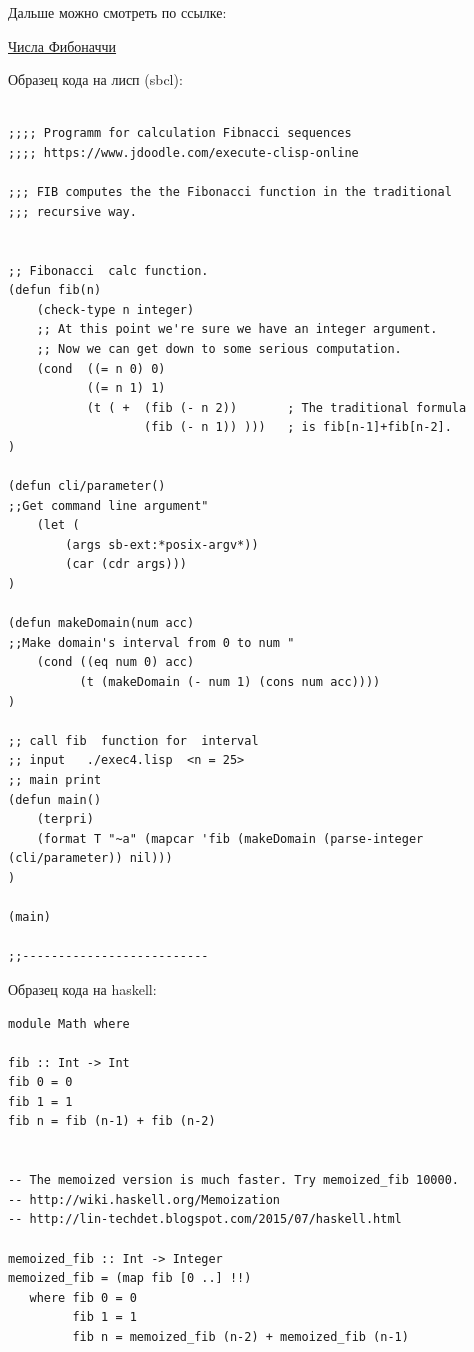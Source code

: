 \documentclass[12pt, leqno]{article}
\begin{document}
 

\clearpage 
 
Дальше можно смотреть по ссылке:

\href{https://ru.wikipedia.org/wiki/Числа_Фибоначчи}{Числа Фибоначчи}


\clearpage 

\noindent Образец кода на лисп (sbcl):  
\begin{verbatim}

;;;; Programm for calculation Fibnacci sequences
;;;; https://www.jdoodle.com/execute-clisp-online

;;; FIB computes the the Fibonacci function in the traditional
;;; recursive way.


;; Fibonacci  calc function. 
(defun fib(n)
    (check-type n integer)
    ;; At this point we're sure we have an integer argument.
    ;; Now we can get down to some serious computation.
    (cond  ((= n 0) 0)
           ((= n 1) 1)
           (t ( +  (fib (- n 2))       ; The traditional formula
                   (fib (- n 1)) )))   ; is fib[n-1]+fib[n-2].
)

(defun cli/parameter()
;;Get command line argument" 
    (let (
        (args sb-ext:*posix-argv*))
        (car (cdr args)))
)

(defun makeDomain(num acc)
;;Make domain's interval from 0 to num " 
    (cond ((eq num 0) acc)
          (t (makeDomain (- num 1) (cons num acc))))
)

;; call fib  function for  interval
;; input   ./exec4.lisp  <n = 25>
;; main print
(defun main()
    (terpri)
    (format T "~a" (mapcar 'fib (makeDomain (parse-integer (cli/parameter)) nil)))
)

(main)

;;--------------------------

\end{verbatim}  


\noindent Образец кода на haskell:


\begin{verbatim}
module Math where

fib :: Int -> Int
fib 0 = 0
fib 1 = 1
fib n = fib (n-1) + fib (n-2)


-- The memoized version is much faster. Try memoized_fib 10000.
-- http://wiki.haskell.org/Memoization
-- http://lin-techdet.blogspot.com/2015/07/haskell.html

memoized_fib :: Int -> Integer
memoized_fib = (map fib [0 ..] !!)
   where fib 0 = 0
         fib 1 = 1
         fib n = memoized_fib (n-2) + memoized_fib (n-1)
\end{verbatim}  
\end{document}
